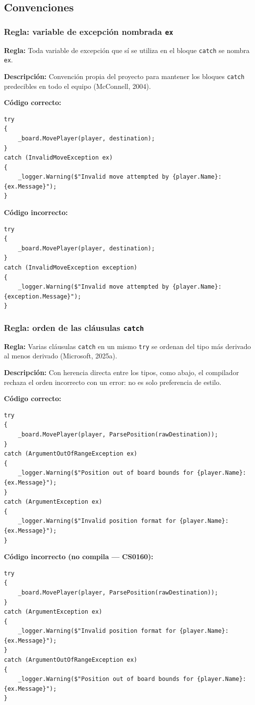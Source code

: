 \subsection{Convenciones}

\subsubsection{Regla: variable de excepción nombrada \texttt{ex}}

\textbf{Regla:} Toda variable de excepción que sí se utiliza en el bloque \texttt{catch} se nombra \texttt{ex}.

\textbf{Descripción:} Convención propia del proyecto para mantener los bloques \texttt{catch} predecibles en todo el equipo (McConnell, 2004).

\textbf{Código correcto:}
\begin{lstlisting}[style=csharpstyle]
try
{
    _board.MovePlayer(player, destination);
}
catch (InvalidMoveException ex)
{
    _logger.Warning($"Invalid move attempted by {player.Name}: {ex.Message}");
}
\end{lstlisting}

\textbf{Código incorrecto:}
\begin{lstlisting}[style=csharpstyle]
try
{
    _board.MovePlayer(player, destination);
}
catch (InvalidMoveException exception)
{
    _logger.Warning($"Invalid move attempted by {player.Name}: {exception.Message}");
}
\end{lstlisting}

\subsubsection{Regla: orden de las cláusulas \texttt{catch}}

\textbf{Regla:} Varias cláusulas \texttt{catch} en un mismo \texttt{try} se ordenan del tipo más derivado al menos derivado (Microsoft, 2025a).

\textbf{Descripción:} Con herencia directa entre los tipos, como abajo, el compilador rechaza el orden incorrecto con un error: no es solo preferencia de estilo.

\textbf{Código correcto:}
\begin{lstlisting}[style=csharpstyle]
try
{
    _board.MovePlayer(player, ParsePosition(rawDestination));
}
catch (ArgumentOutOfRangeException ex)
{
    _logger.Warning($"Position out of board bounds for {player.Name}: {ex.Message}");
}
catch (ArgumentException ex)
{
    _logger.Warning($"Invalid position format for {player.Name}: {ex.Message}");
}
\end{lstlisting}

\textbf{Código incorrecto (no compila --- CS0160):}
\begin{lstlisting}[style=csharpstyle]
try
{
    _board.MovePlayer(player, ParsePosition(rawDestination));
}
catch (ArgumentException ex)
{
    _logger.Warning($"Invalid position format for {player.Name}: {ex.Message}");
}
catch (ArgumentOutOfRangeException ex)
{
    _logger.Warning($"Position out of board bounds for {player.Name}: {ex.Message}");
}
\end{lstlisting}
